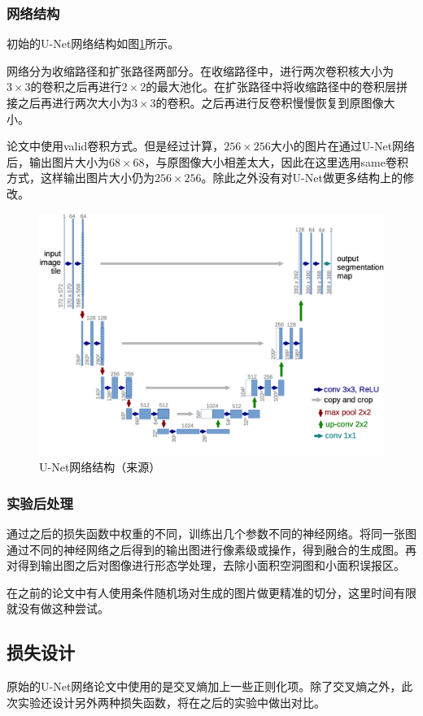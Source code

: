 \subsubsection{网络结构}
初始的U-Net网络结构如图\ref{Fig:unet_construction}所示。

网络分为收缩路径和扩张路径两部分。在收缩路径中，进行两次卷积核大小为$3\times 3$的卷积之后再进行$2\times 2$的最大池化。在扩张路径中将收缩路径中的卷积层拼接之后再进行两次大小为$3\times 3$的卷积。之后再进行反卷积慢慢恢复到原图像大小。

论文\cite{ronneberger2015u}中使用valid卷积方式。但是经过计算，$256\times 256$大小的图片在通过U-Net网络后，输出图片大小为$68\times 68$，与原图像大小相差太大，因此在这里选用same卷积方式，这样输出图片大小仍为$256\times 256$。除此之外没有对U-Net做更多结构上的修改。
\begin{figure}[!t]
    \centering
    \includegraphics[width=1\textwidth]{Figures/unet_construction.png}
    \caption{U-Net网络结构（来源\cite{ronneberger2015u}）}
    \label{Fig:unet_construction}
\end{figure}
\subsubsection{实验后处理}
通过之后的损失函数中权重的不同，训练出几个参数不同的神经网络。将同一张图通过不同的神经网络之后得到的输出图进行像素级或操作，得到融合的生成图。再对得到输出图之后对图像进行形态学处理，去除小面积空洞图和小面积误报区。

在之前的论文中有人使用条件随机场对生成的图片做更精准的切分，这里时间有限就没有做这种尝试。
\subsection{损失设计}
原始的U-Net网络论文中使用的是交叉熵加上一些正则化项。除了交叉熵之外，此次实验还设计另外两种损失函数，将在之后的实验中做出对比。

